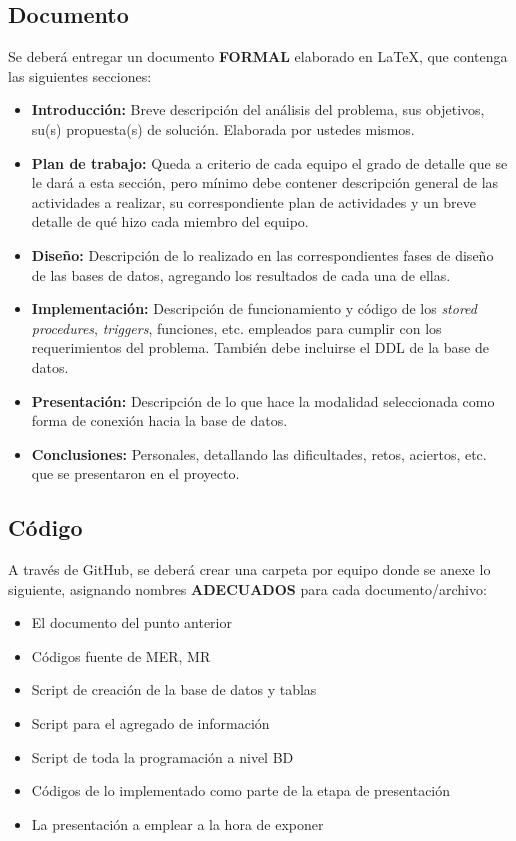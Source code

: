 \documentclass[10pt,openany]{book}
\begin{document}
\subsection{Documento}
Se deberá entregar un documento \textbf{FORMAL} elaborado en LaTeX, que contenga las siguientes secciones:
\begin{itemize}
    \item \textbf{Introducción:} Breve descripción del análisis del problema, sus objetivos, su(s) propuesta(s) de solución. Elaborada por ustedes mismos.
    \item \textbf{Plan de trabajo:} Queda a criterio de cada equipo el grado de detalle que se le dará a esta sección, pero mínimo debe contener descripción general de las actividades a realizar, su correspondiente plan de actividades y un breve detalle de qué hizo cada miembro del equipo.
    \item \textbf{Diseño:} Descripción de lo realizado en las correspondientes fases de diseño de las bases de datos, agregando los resultados de cada una de ellas.
    \item \textbf{Implementación:} Descripción de funcionamiento y código de los \textit{stored procedures}, \textit{triggers}, funciones, etc. empleados para cumplir con los requerimientos del problema. También debe incluirse el DDL de la base de datos.
    \item \textbf{Presentación:} Descripción de lo que hace la modalidad seleccionada como forma de conexión hacia la base de datos.
    \item \textbf{Conclusiones:} Personales, detallando las dificultades, retos, aciertos, etc. que se presentaron en el proyecto.
\end{itemize}

\subsection{Código}
A través de GitHub, se deberá crear una carpeta por equipo donde se anexe lo siguiente, asignando nombres \textbf{ADECUADOS} para cada documento/archivo:
\begin{itemize}
    \item El documento del punto anterior
    \item Códigos fuente de MER, MR
    \item Script de creación de la base de datos y tablas
    \item Script para el agregado de información
    \item Script de toda la programación a nivel BD
    \item Códigos de lo implementado como parte de la etapa de presentación
    \item La presentación a emplear a la hora de exponer
\end{itemize}
\end{document}
